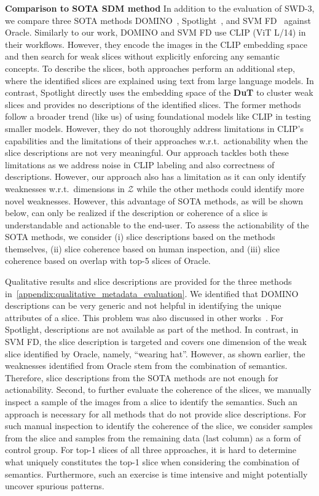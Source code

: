 \textbf{Comparison to SOTA SDM method}
In addition to the evaluation of SWD-3, we compare three SOTA methods DOMINO~\citep{eyuboglu2022domino}, Spotlight~\citep{d2022spotlight}, and SVM FD~\citep{jain2023distilling} against Oracle.
Similarly to our work, DOMINO and SVM FD use CLIP (ViT L/14) in their workflows. However, they encode the images in the CLIP embedding space and then search for weak slices without explicitly enforcing any semantic concepts. To describe the slices, both approaches perform an additional step, where the identified slices are explained using text from large language models. In contrast, Spotlight directly uses the embedding space of the \textbf{DuT} to cluster weak slices and provides no descriptions of the identified slices. The former methods follow a broader trend (like us) of using foundational models like CLIP in testing smaller models. However, they do not thoroughly address limitations in CLIP's capabilities and the limitations of their approaches w.r.t.\ actionability when the slice descriptions are not very meaningful. Our approach tackles both these limitations as we address noise in CLIP labeling and also correctness of descriptions. However, our approach also has a limitation as it can only identify weaknesses w.r.t.\ dimensions in $\mathcal Z$ while the other methods could identify more novel weaknesses. However, this advantage of SOTA methods, as will be shown below, can only be realized if the description or coherence of a slice is understandable and actionable to the end-user. To assess the actionability of the SOTA methods, we consider (i) slice descriptions based on the methods themselves, (ii) slice coherence based on human inspection, and (iii) slice coherence based on overlap with top-5 slices of Oracle.


Qualitative results and slice descriptions are provided for the three methods in~\cref{appendix:qualitative_metadata_evaluation}. We identified that DOMINO descriptions can be very generic and not helpful in identifying the unique attributes of a slice. This problem was also discussed in other works~\citep{jain2023distilling, gao2023adaptive}. For Spotlight, descriptions are not available as part of the method. In contrast, in SVM FD, the slice description is targeted and covers one dimension of the weak slice identified by Oracle, namely, ``wearing hat''. However, as shown earlier, the weaknesses identified from Oracle stem from the combination of semantics. Therefore, slice descriptions from the SOTA methods are not enough for actionability. 
Second, to further evaluate the coherence of the slices, we manually inspect a sample of the images from a slice to identify the semantics. Such an approach is necessary for all methods that do not provide slice descriptions. For such manual inspection to identify the coherence of the slice, we consider samples from the slice and samples from the remaining data (last column) as a form of control group. For top-1 slices of all three approaches, it is hard to determine what uniquely constitutes the top-1 slice when considering the combination of semantics. Furthermore, such an exercise is time intensive and might potentially uncover spurious patterns.

